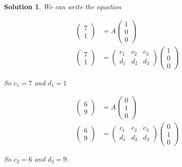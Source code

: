 \documentclass{article}
\newtheorem*{solution}{Solution}
\begin{document}
\begin{solution}
We can write the equation

\begin{align*}
\begin{pmatrix}
7 \\ 1
\end{pmatrix}
&= A \begin{pmatrix} 1 \\ 0 \\ 0 \end{pmatrix} \\
\begin{pmatrix}
7 \\ 1
\end{pmatrix}
&= 
\begin{pmatrix} 
c_{1} & c_{2} & c_{3} \\
d_{1} & d_{2} & d_{3}
\end{pmatrix}
\begin{pmatrix} 1 \\ 0 \\ 0 \end{pmatrix}
\end{align*}

So $c_{1} = 7$ and $d_{1} = 1$

\begin{align*}
\begin{pmatrix}
6 \\ 9
\end{pmatrix}
&= A \begin{pmatrix} 0 \\ 1 \\ 0 \end{pmatrix} \\
\begin{pmatrix}
6 \\ 9
\end{pmatrix}
&= 
\begin{pmatrix} 
c_{1} & c_{2} & c_{3} \\
d_{1} & d_{2} & d_{3}
\end{pmatrix}
\begin{pmatrix} 0 \\ 1 \\ 0 \end{pmatrix}
\end{align*}

So $c_{2} = 6$ and $d_{2} = 9$.


\end{solution}
\end{document}
